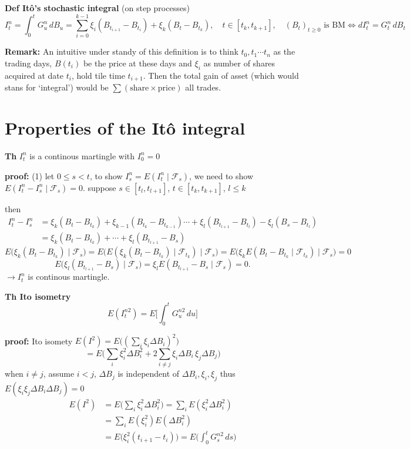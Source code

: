 \documentclass[
  letterpaper,
  DIV=11,
  numbers=noendperiod]{scrreprt}
\theoremstyle{definition}
\theoremstyle{plain}
\theoremstyle{plain}
\theoremstyle{definition}
\theoremstyle{plain}
\theoremstyle{plain}
\theoremstyle{remark}
\begin{document}
\textbf{Def Itô's stochastic integral} (on step processes) \[
I_t^n = \int_0^t G_u^n \, dB_u = \sum_{i=0}^{k-1} \xi_i(B_{t_{i+1}} - B_{t_i}) + \xi_k(B_t - B_{t_k}), \quad t \in [t_k, t_{k+1}], \quad (B_t)_{t \geq 0} \text{ is BM} \iff dI_t^n = G_t^n \, dB_t
\]

\textbf{Remark:} An intuitive under standy of this definition is to
think \(t_0, t_1 \cdots t_n\) as the trading days, \(B(t_i)\) be the
price at these days and \(\xi_i\) as number of shares acquired at date
\(t_i\), hold tile time \(t_{i+1}\). Then the total gain of asset (which
would stans for `integral') would be
\(\sum(\text{share} \times \text{price})\) all trades.

\section{Properties of the Itô
integral}\label{properties-of-the-ituxf4-integral}

\textbf{Th} \(I_t^n\) is a continous martingle with \(I_0^n = 0\)

\textbf{proof:} (1) let \(0 \leq s < t\), to show
\(I_s^n = E(I_t^n \mid \mathcal{F}_s)\), we need to show
\(E(I_t^n - I_s^n \mid \mathcal{F}_s) = 0\). suppose
\(s \in [t_l, t_{l+1}]\), \(t \in [t_k, t_{k+1}]\), \(l \leq k\)

then \[
\begin{aligned}
I_t^n - I_s^n &= \xi_k(B_t - B_{t_k}) + \xi_{k-1}(B_{t_k} - B_{t_{k-1}}) \cdots + \xi_l(B_{t_{l+1}} - B_{t_l}) - \xi_l(B_s - B_{t_l}) \\
&= \xi_k(B_t - B_{t_k}) + \cdots + \xi_l(B_{t_{l+1}} - B_s)
\end{aligned}
\] \[
E\big(\xi_k(B_t - B_{t_k}) \mid \mathcal{F}_s\big) = E\big(E(\xi_k(B_t - B_{t_k}) \mid \mathcal{F}_{t_k}) \mid \mathcal{F}_s\big) = E\big(\xi_k E(B_t - B_{t_k} \mid \mathcal{F}_{t_k}) \mid \mathcal{F}_s\big) = 0
\] \[
E\big(\xi_l(B_{t_{l+1}} - B_s) \mid \mathcal{F}_s\big) = \xi_l E(B_{t_{l+1}} - B_s \mid \mathcal{F}_s) = 0.
\] \(\to I_t^n\) is continous martingle.

\textbf{Th Ito isometry} \[
E(I_t^{n2}) = E\Big[\int_0^t G_u^{n2} \, du\Big]
\]

\textbf{proof:} Ito isomety
\(E(I^2) = E\big((\sum_i \xi_i \Delta B_i)^2\big)\) \[
= E\Big(\sum_i \xi_i^2 \Delta B_i^2 + 2\sum_{i \neq j} \xi_i \Delta B_i \, \xi_j \Delta B_j\Big)
\] when \(i \neq j\), assume \(i < j\), \(\Delta B_j\) is independent of
\(\Delta B_i, \xi_i, \xi_j\) thus
\(E(\xi_i \xi_j \Delta B_i \Delta B_j) = 0\) \[
\begin{aligned}
E(I^2) &= E\Big(\sum_i \xi_i^2 \Delta B_i^2\Big) = \sum_i E(\xi_i^2 \Delta B_i^2) \\
&= \sum_i E(\xi_i^2) E(\Delta B_i^2) \\
&= E\big(\xi_i^2 (t_{i+1} - t_i)\big) = E\Big(\int_0^t G_s^{n2} \, ds\Big)
\end{aligned}
\]
\end{document}
